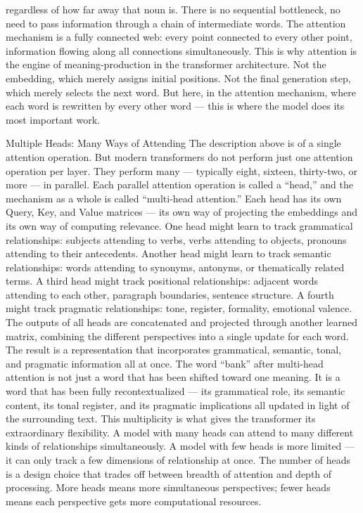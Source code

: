 regardless of how far away that noun is. There is no sequential bottleneck, no need to pass information through a chain of intermediate words. The attention mechanism is a fully connected web: every point connected to every other point, information flowing along all connections simultaneously. This is why attention is the engine of meaning-production in the transformer architecture. Not the embedding, which merely assigns initial positions. Not the final generation step, which merely selects the next word. But here, in the attention mechanism, where each word is rewritten by every other word — this is where the model does its most important work.

Multiple Heads: Many Ways of Attending The description above is of a single attention operation. But modern transformers do not perform just one attention operation per layer. They perform many — typically eight, sixteen, thirty-two, or more — in parallel. Each parallel attention operation is called a “head,” and the mechanism as a whole is called “multi-head attention.” Each head has its own Query, Key, and Value matrices — its own way of projecting the embeddings and its own way of computing relevance. One head might learn to track grammatical relationships: subjects attending to verbs, verbs attending to objects, pronouns attending to their antecedents. Another head might learn to track semantic relationships: words attending to synonyms, antonyms, or thematically related terms. A third head might track positional relationships: adjacent words attending to each other, paragraph boundaries, sentence structure. A fourth might track pragmatic relationships: tone, register, formality, emotional valence. The outputs of all heads are concatenated and projected through another learned matrix, combining the different perspectives into a single update for each word. The result is a representation that incorporates grammatical, semantic, tonal, and pragmatic information all at once. The word “bank” after multi-head attention is not just a word that has been shifted toward one meaning. It is a word that has been fully recontextualized — its grammatical role, its semantic content, its tonal register, and its pragmatic implications all updated in light of the surrounding text. This multiplicity is what gives the transformer its extraordinary flexibility. A model with many heads can attend to many different kinds of relationships simultaneously. A model with few heads is more limited — it can only track a few dimensions of relationship at once. The number of heads is a design choice that trades off between breadth of attention and depth of processing. More heads means more simultaneous perspectives; fewer heads means each perspective gets more computational resources.

